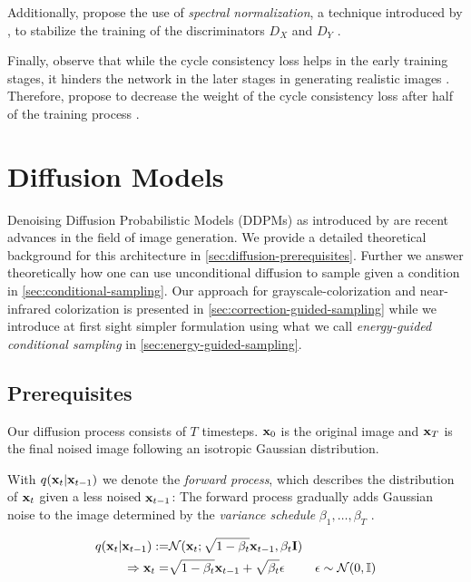 Additionally, \citeauthor*{mehri} propose the use of \textit{spectral normalization}, a technique introduced by , to stabilize the training of the discriminators $D_X$ and $D_Y$ \parencite{spectral-norm, mehri}.

Finally, \citeauthor*{mehri} observe that while the cycle consistency loss helps in the early training stages, it hinders the network in the later stages in generating realistic images \parencite{mehri}.
Therefore, \citeauthor*{mehri} propose to decrease the weight of the cycle consistency loss after half of the training process \parencite{mehri}.

\section{Diffusion Models}
Denoising Diffusion Probabilistic Models (DDPMs) as introduced by \cite{ddpm} are recent advances in the field of image generation.
We provide a detailed theoretical background for this architecture in \autoref{sec:diffusion-prerequisites}.
Further we answer theoretically how one can use unconditional diffusion to sample given a condition in \autoref{sec:conditional-sampling}.
Our approach for grayscale-colorization and near-infrared colorization is presented in \autoref{sec:correction-guided-sampling} while
we introduce at first sight simpler formulation using what we call \textit{energy-guided conditional sampling} in \autoref{sec:energy-guided-sampling}.

\subsection{Prerequisites}
\label{sec:diffusion-prerequisites}
Our diffusion process consists of $T$ timesteps.
$\mathbf{x}_0$ is the original image and $\mathbf{x}_T$ is the final noised image following an isotropic Gaussian distribution.

With $q(\mathbf{x}_t | \mathbf{x}_{t-1})$ we denote the \textit{forward process}, which describes the distribution of $\mathbf{x}_t$ given a less noised $\mathbf{x}_{t-1}$:
The forward process gradually adds Gaussian noise to the image determined by the \textit{variance schedule} $\beta_1, \dots, \beta_T$ \parencite[\autoref{eqn:forward-process-definition}]{ddpm}.

\begin{equation}
   \label{eqn:forward-process-definition}
   \begin{aligned}
      q(\mathbf{x}_t | \mathbf{x}_{t-1}) := & \mathcal{N}(\mathbf{x}_t; \sqrt{1 - \beta_t}\mathbf{x}_{t-1}, \beta_t \mathbf{I})                                            \\
      \Rightarrow \mathbf{x}_t =            & \sqrt{1 - \beta_t}\mathbf{x}_{t-1} + \sqrt{\beta_t} \epsilon              & \epsilon \sim \mathcal{N}(0, \mathbb{I})
   \end{aligned}
\end{equation}

